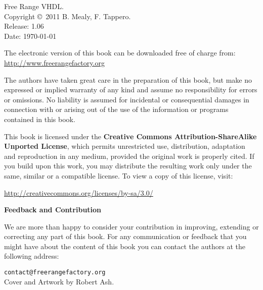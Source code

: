 %
%
%
\setcounter{page}{1}

\small
\noindent
Free Range VHDL.\\
Copyright \copyright \ 2011 B. Mealy, F. Tappero.\\
Release: 1.06\\
Date: \today
\vspace{20pt}

\noindent
The electronic version of this book can be downloaded free of charge from:\\ 
\url{http://www.freerangefactory.org}\\

\vspace{20pt}

\noindent
The authors have taken great care in the preparation of this book, but make no expressed or implied warranty of any kind and assume no responsibility for errors or omissions. No liability is assumed for incidental or consequential damages in connection with or arising out of the use of the information or programs contained in this book.

\noindent
This book is licensed under the \textbf{Creative Commons Attribution-ShareAlike Unported License}, which permits unrestricted use, distribution, adaptation and reproduction in any medium, provided the original work is properly cited. If you build upon this work, you may distribute the resulting work only under the same, similar or a compatible license. To view a copy of this license, visit:
\vspace{5pt}

\noindent
\url{http://creativecommons.org/licenses/by-sa/3.0/}
\vspace{20pt}

\noindent
{\sffamily\bfseries Feedback and Contribution}

\noindent
We are more than happy to consider your contribution in improving, extending or correcting any part of this book.
For any communication or feedback that you might have about the content of this book you can contact the authors at the following address:
\vspace{2pt}

\noindent
\texttt{contact@freerangefactory.org}\\

\vfill
\noindent
Cover and Artwork by Robert Ash.


